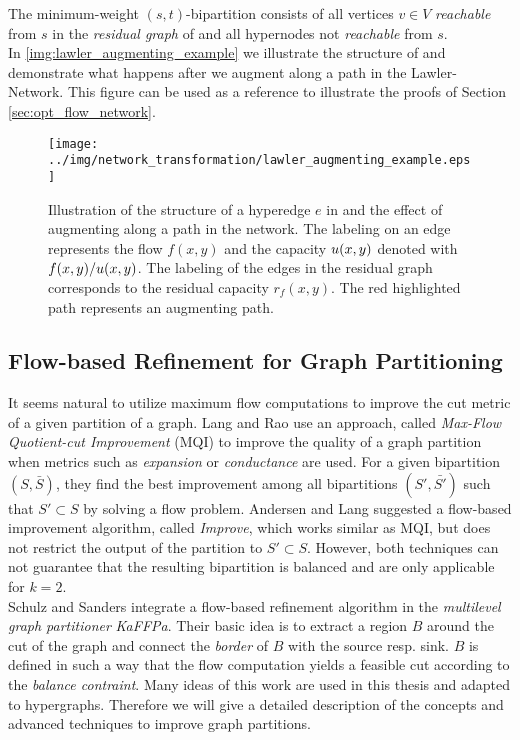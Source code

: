 The minimum-weight $(s,t)$-bipartition consists of all vertices $v \in V$ \emph{reachable} from $s$ in the 
\emph{residual graph} of  and all hypernodes not \emph{reachable}
from $s$. \\ 
In \autoref{img:lawler_augmenting_example} we illustrate the structure of  and demonstrate
what happens after we augment along a path in the Lawler-Network. This figure can be used as
a reference to illustrate the proofs of Section \ref{sec:opt_flow_network}.\\
\begin{figure}[t!]
\centering
\texttt{[image: ../img/network\_transformation/lawler\_augmenting\_example.eps]}
\caption{Illustration of the structure of a hyperedge $e$ in  and the effect of augmenting
         along a path in the network. The labeling on an edge represents the flow $f(x,y)$ and
         the capacity $u(x,y)$ denoted with $f(x,y)/u(x,y)$. The labeling of the
         edges in the residual graph corresponds to the residual capacity $r_f(x,y)$. The red highlighted
         path represents an augmenting path.}
\label{img:lawler_augmenting_example} 
\end{figure}


\subsection{Flow-based Refinement for Graph Partitioning}
\label{sec:flow_local_search_graph} 

It seems natural to utilize maximum flow computations to improve the cut metric of a 
given partition of a graph. Lang and Rao \cite{lang2004flow} use an approach,
called \emph{Max-Flow Quotient-cut Improvement} (MQI) to improve the quality
of a graph partition when metrics such as \emph{expansion} or \emph{conductance}
are used. For a given bipartition $(S,\bar{S})$, they find the best 
improvement among all bipartitions $(S',\bar{S'})$ such that $S' \subset S$
by solving a flow problem. Andersen and Lang \cite{andersen2008algorithm}
suggested a flow-based improvement algorithm, called \emph{Improve},
which works similar as MQI, but does not restrict the output of the 
partition to $S' \subset S$. However, both techniques can not guarantee 
that the resulting bipartition is balanced and are only applicable for $k=2$. \\
Schulz and Sanders \cite{sanders2011engineering} integrate a flow-based refinement algorithm 
in the \emph{multilevel graph partitioner} \emph{KaFFPa}. Their basic idea is
to extract a region $B$ around the cut of the graph and connect the \emph{border} 
of $B$ with the source resp. sink. $B$ is defined in such a way that the flow computation
yields a feasible cut according to the \emph{balance contraint}. Many ideas of this work are used in this
thesis and adapted to hypergraphs. Therefore we will give a detailed description
of the concepts and advanced techniques to improve graph partitions.

